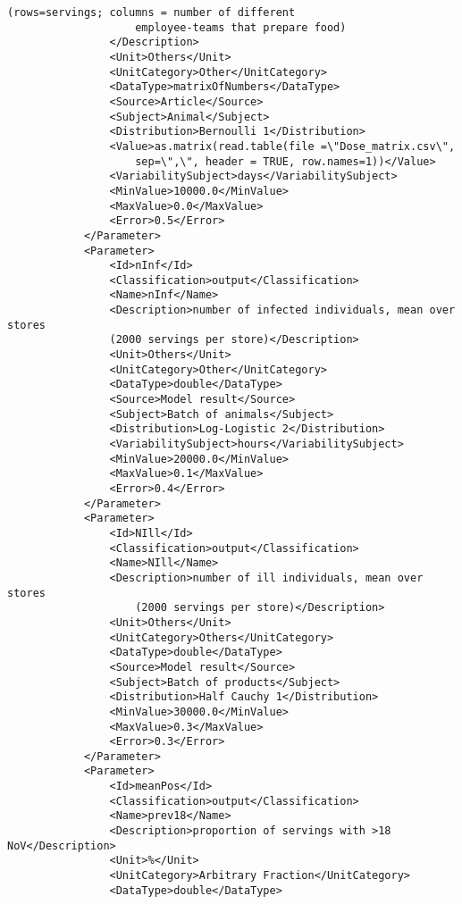 \begin{lstlisting}[language=RAKIP, caption={Example of GenericModel}]
                    (rows=servings; columns = number of different
                    employee-teams that prepare food)
                </Description>
                <Unit>Others</Unit>
                <UnitCategory>Other</UnitCategory>
                <DataType>matrixOfNumbers</DataType>
                <Source>Article</Source>
                <Subject>Animal</Subject>
                <Distribution>Bernoulli 1</Distribution>
                <Value>as.matrix(read.table(file =\"Dose_matrix.csv\",
                    sep=\",\", header = TRUE, row.names=1))</Value>
                <VariabilitySubject>days</VariabilitySubject>
                <MinValue>10000.0</MinValue>
                <MaxValue>0.0</MaxValue>
                <Error>0.5</Error>
            </Parameter>
            <Parameter>
                <Id>nInf</Id>
                <Classification>output</Classification>
                <Name>nInf</Name>
                <Description>number of infected individuals, mean over stores
                (2000 servings per store)</Description>
                <Unit>Others</Unit>
                <UnitCategory>Other</UnitCategory>
                <DataType>double</DataType>
                <Source>Model result</Source>
                <Subject>Batch of animals</Subject>
                <Distribution>Log-Logistic 2</Distribution>
                <VariabilitySubject>hours</VariabilitySubject>
                <MinValue>20000.0</MinValue>
                <MaxValue>0.1</MaxValue>
                <Error>0.4</Error>
            </Parameter>
            <Parameter>
                <Id>NIll</Id>
                <Classification>output</Classification>
                <Name>NIll</Name>
                <Description>number of ill individuals, mean over stores
                    (2000 servings per store)</Description>
                <Unit>Others</Unit>
                <UnitCategory>Others</UnitCategory>
                <DataType>double</DataType>
                <Source>Model result</Source>
                <Subject>Batch of products</Subject>
                <Distribution>Half Cauchy 1</Distribution>
                <MinValue>30000.0</MinValue>
                <MaxValue>0.3</MaxValue>
                <Error>0.3</Error>
            </Parameter>
            <Parameter>
                <Id>meanPos</Id>
                <Classification>output</Classification>
                <Name>prev18</Name>
                <Description>proportion of servings with >18 NoV</Description>
                <Unit>%</Unit>
                <UnitCategory>Arbitrary Fraction</UnitCategory>
                <DataType>double</DataType>

\end{lstlisting}
